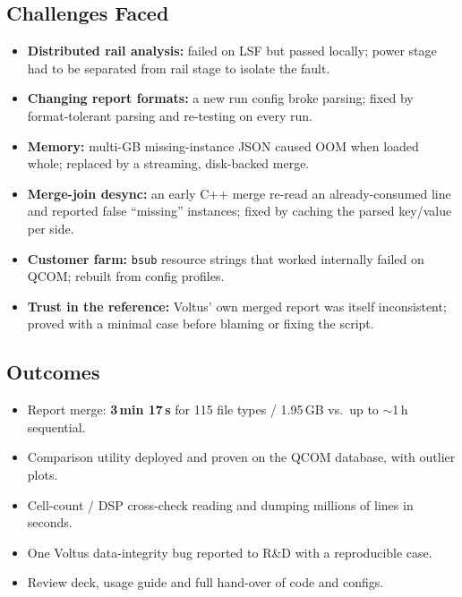 \documentclass[11pt,a4paper]{article}
\newcommand{\fn}[1]{\texttt{#1}}                 %
\begin{document}
\subsection{Challenges Faced}
\begin{itemize}
  \item \textbf{Distributed rail analysis:} failed on LSF but passed locally; power stage had
        to be separated from rail stage to isolate the fault.
  \item \textbf{Changing report formats:} a new run config broke parsing; fixed by
        format-tolerant parsing and re-testing on every run.
  \item \textbf{Memory:} multi-GB missing-instance JSON caused OOM when loaded whole; replaced
        by a streaming, disk-backed merge.
  \item \textbf{Merge-join desync:} an early C++ merge re-read an already-consumed line and
        reported false ``missing'' instances; fixed by caching the parsed key/value per side.
  \item \textbf{Customer farm:} \fn{bsub} resource strings that worked internally failed on
        QCOM; rebuilt from config profiles.
  \item \textbf{Trust in the reference:} Voltus' own merged report was itself inconsistent;
        proved with a minimal case before blaming or fixing the script.
\end{itemize}

\subsection{Outcomes}
\begin{itemize}
  \item Report merge: \textbf{3\,min 17\,s} for 115 file types / 1.95\,GB vs.\ up to
        $\sim$1\,h sequential.
  \item Comparison utility deployed and proven on the QCOM database, with outlier plots.
  \item Cell-count / DSP cross-check reading and dumping millions of lines in seconds.
  \item One Voltus data-integrity bug reported to R\&D with a reproducible case.
  \item Review deck, usage guide and full hand-over of code and configs.
\end{itemize}
\end{document}
